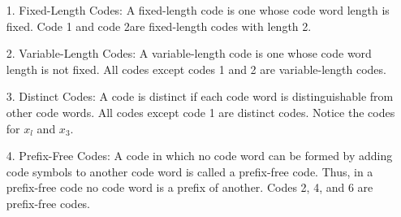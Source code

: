 \documentclass[a4]{beamer}
\begin{document}
\begin{frame}
\begin{itemize}
\item[1.] Fixed-Length Codes: A fixed-length code is one whose code word length is fixed. Code 1 and code 2are
fixed-length codes with length 2.
\item[2.] Variable-Length Codes: A variable-length code is one whose code word length is not fixed. All codes except codes 1 and 2 are variable-length codes.
\item[3.] Distinct Codes:
A code is distinct if each code word is distinguishable from other code words. All codes except code 1 are distinct codes. Notice the codes for $x_l$ and $x_3$.
\item[4.] Prefix-Free Codes:
A code in which no code word can be formed by adding code symbols to another code word is
called a prefix-free code. Thus, in a prefix-free code no code word is a prefix of another. Codes 2, 4,
and 6 are prefix-free codes.
\end{itemize}
\end{frame}
\end{document}
